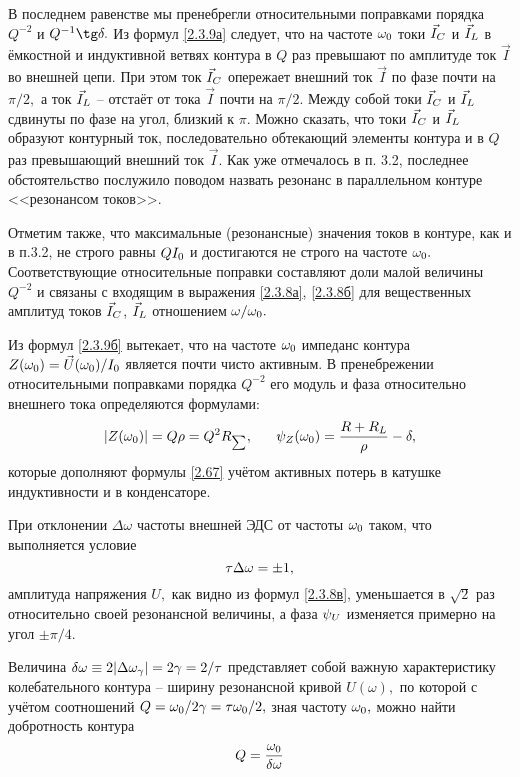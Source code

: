 В последнем равенстве мы пренебрегли относительными поправками порядка $Q^{-2}$ и $Q^{-1}\tg\delta.$ Из формул \eqref{2.3.9а} следует, что на частоте $\omega_{\sc{0}}$ токи $\vec I_{\sc{C}}$ и $\vec I_{\sc{L}}$ в ёмкостной и индуктивной ветвях контура в $Q$ раз превышают по амплитуде ток $\vec I$ во внешней цепи. При этом ток $\vec I_{\sc{C}}$ опережает внешний ток $\vec I$ по фазе почти на $\pi/2,$ а ток $\vec I_{\sc{L}}$ – отстаёт от тока $\vec I$ почти на $\pi/2.$ Между собой токи $\vec I_{\sc{C}}$ и $\vec I_{\sc{L}}$ сдвинуты по фазе на угол, близкий к  $\pi.$ Можно сказать, что токи $\vec I_{\sc{C}}$ и $\vec I_{\sc{L}}$ образуют контурный ток, последовательно обтекающий элементы контура и в $Q$ раз превышающий внешний ток $\vec I.$ Как уже отмечалось в п. 3.2, последнее обстоятельство послужило поводом назвать резонанс в параллельном контуре <<резонансом токов>>.

Отметим также, что максимальные (резонансные) значения токов в контуре, как и в п.3.2, не строго равны $QI_{\sc{0}}$ и достигаются не строго на частоте $\omega_{\sc{0}}.$ Соответствующие относительные поправки составляют доли малой величины $Q^{-2}$ и связаны с входящим в выражения \eqref{2.3.8а}, \eqref{2.3.8б} для вещественных амплитуд токов $\vec I_{\sc{C}}$, $\vec I_{\sc{L}}$ отношением $\omega/\omega_{\sc{0}}.$

Из формул \eqref{2.3.9б} вытекает, что на частоте $\omega_{\sc{0}}$ импеданс контура $Z(\omega_{\sc{0}})=\vec U(\omega_{\sc{0}})/I_{\sc{0}}$ является почти чисто активным. В пренебрежении относительными поправками порядка $Q^{-2}$ его модуль и фаза относительно внешнего тока определяются формулами:
\begin{equation}\eqmark{2.3.10}
|Z(\omega_{\sc{0}})|=Q\rho=Q^2R_{\sc{\sum}},~~~~~\psi_{\sc{Z}}(\omega_{\sc{0}})=\dfrac{R+R_{\sc{L}}}{\rho}-\delta,
\end{equation}
которые дополняют формулы \eqref{2.67} учётом активных потерь в катушке индуктивности и в конденсаторе.

При отклонении $\Delta\omega$ частоты внешней ЭДС от частоты $\omega_{\sc{0}}$ таком, что выполняется условие
\begin{equation}\eqmark{2.3.11}
\tau\Delta\omega=\pm1,
\end{equation}
амплитуда напряжения $U,$ как видно из формул \eqref{2.3.8в}, уменьшается в $\sqrt{2}$ раз относительно своей резонансной величины, а фаза $\psi_{\sc{U}}$ изменяется примерно на угол $\pm\pi/4.$

Величина $\delta\omega\equiv2|\Delta\omega_{\sc{\gamma}}|=2\gamma=2/\tau$ представляет собой важную характеристику колебательного контура – \textsf{ширину резонансной кривой} $U(\omega),$ по которой с учётом соотношений $Q=\omega_{\sc{0}}/2\gamma=\tau\omega_{\sc{0}}/2,$ зная частоту $\omega_{\sc{0}},$ можно найти добротность контура
\begin{equation}\eqmark{2.3.12}
Q=\dfrac{\omega_{\sc{0}}}{\delta\omega}
\end{equation}

